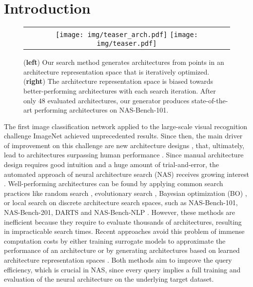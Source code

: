 \documentclass[runningheads]{llncs}
\begin{document}
\section{Introduction}

\begin{figure}[t]

    \centering
    \begin{tabular}{c}
        \texttt{[image: img/teaser\_arch.pdf]} 
        \texttt{[image: img/teaser.pdf]}
    \end{tabular}
    \caption{
        (\textbf{left}) Our search method generates architectures from points in an architecture representation space that is iteratively optimized.
        (\textbf{right}) The architecture representation space is biased towards better-performing architectures with each search iteration.
        After only $48$ evaluated architectures, our generator produces state-of-the-art performing architectures on NAS-Bench-101.
    }
    \label{fig:teaser}

\end{figure}

The first image classification network \cite{2012AlexNet} applied to the large-scale visual recognition challenge ImageNet \cite{2009ImageNet} achieved unprecedented results. Since then, the main driver of improvement on this challenge are new architecture designs \cite{2014VGG,2015GoogleNet}, \cite{2016Inception,2016ResNet} that, ultimately, lead to architectures surpassing human performance \cite{2015ReLU}.
Since manual architecture design requires good intuition and a huge amount of trial-and-error, the automated approach of neural architecture search (NAS) receives growing interest \cite{2017EvolutionaryNAS,2018LearningNAS,2019NB101,2020NB201,2020NBNLP,2021HWNNB}. Well-performing architectures can be found by applying common search practices like random search \cite{2012RandomNAS}, evolutionary search \cite{2017EvolutionaryNAS,2019EvolutionaryNAS}, Bayesian optimization (BO) \cite{2018BONAS,2020BONAS,2021BANANAS}, or local search \cite{2020LocalSearchNAS} on discrete architecture search spaces, such as NAS-Bench-101, NAS-Bench-201, DARTS and NAS-Bench-NLP  \cite{2019NB101,2020NB201,2018DARTS,2020NBNLP}. However, these methods are inefficient because they require to evaluate thousands of architectures, resulting in impracticable search times. Recent approaches avoid this problem of immense computation costs by either training surrogate models to approximate the performance of an architecture \cite{2018DARTS,2019ProxyNAS} or by generating architectures based on learned architecture representation spaces \cite{2019VAENAS,2021SVGe}.
Both methods aim to improve the query efficiency, which is crucial in NAS, since every query implies a full training and evaluation of the neural architecture on the underlying target dataset. 
\end{document}
